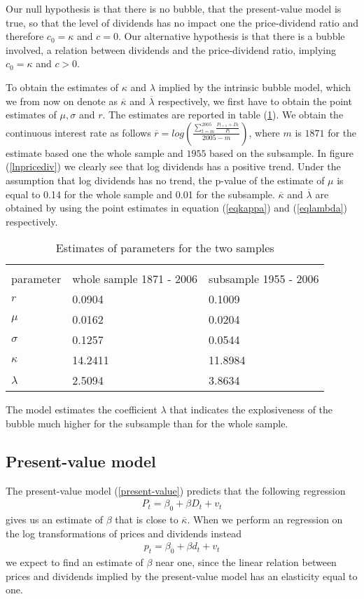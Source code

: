 \documentclass{article}
\begin{document}
Our null hypothesis is that there is no bubble, that the present-value model is true, so that the level of dividends has no impact one the price-dividend ratio  and therefore $c_0 = \kappa$ and $c=0$. Our alternative hypothesis is that there is a bubble involved, a relation between dividends and the price-dividend ratio, implying $c_0 = \kappa$ and $c > 0$. 


To obtain the estimates of $\kappa$ and $\lambda$ implied by the intrinsic bubble model, which we from now on denote as $\overline{\kappa}$ and $\overline{\lambda}$ respectively, we first have to obtain the point estimates of $\mu, \sigma$ and $r$. The estimates are reported in table (\ref{point}). We obtain the continuous interest rate as follows  $\overline{r} = log(\frac{\sum_{t=m}^{2005}\frac{P_{t+1} + D_t}{P_t}}{2005-m})$, where $m$ is $1871$ for the estimate based one the whole sample and  $1955$ based on the subsample. In figure (\ref{lnpricediv}) we clearly see that log dividends has a positive trend. Under the assumption that log dividends has no trend, the p-value of the estimate of $\mu$ is equal to 0.14 for the whole sample and 0.01 for the subsample.  $\overline{\kappa}$ and $\overline{\lambda}$ are obtained by using the point estimates in equation (\ref{eqkappa}) and (\ref{eqlambda}) respectively.


\begin{table}[h!]
\centering
\begin{tabular}{l | l l  }
\hline \\
parameter & whole sample 1871 - 2006 & subsample 1955 - 2006\\ \hline 
$r$  & 0.0904 & 0.1009 \\
$\mu$ & 0.0162 & 0.0204\\
$\sigma$ & 0.1257 & 0.0544 \\
$\kappa$ & 14.2411 & 11.8984 \\
${\lambda}$ & 2.5094 &  3.8634 \\
\end{tabular}
\caption{Estimates of parameters for the two samples}
\label{point}
\end{table}
The model estimates the coefficient $\lambda$ that indicates the explosiveness of the bubble much higher for the subsample than for the whole sample. 


\subsection{Present-value model}
The present-value model (\ref{present-value}) predicts that the following regression 
\begin{eqnarray}
P_t = \beta_0 + \beta D_t  + v_t \label{regpv}
\end{eqnarray}
gives us an estimate of $\beta$ that is close to $\overline{\kappa}$. When we perform an regression on the log transformations of prices and dividends instead 
\begin{eqnarray}
p_t = \beta_0 + \beta d_t  + v_t \label{reglnpv}
\end{eqnarray}
we expect to find an estimate of $\beta$ near one, since the linear relation between prices and dividends implied by the present-value model has an elasticity equal to one. \\
\end{document}
